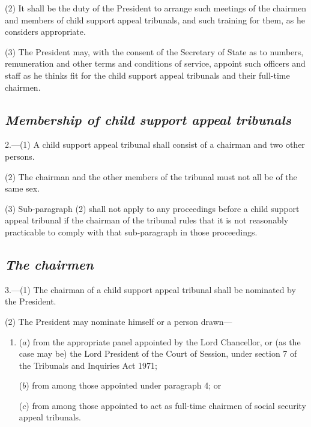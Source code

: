 \documentclass[12pt,a4paper]{article}
\begin{document}
(2) It shall be the duty of the President to arrange such meetings of the chairmen and members of child support appeal tribunals, and such training for them, as he considers appropriate.

(3) The President may, with the consent of the Secretary of State as to numbers, remuneration and other terms and conditions of service, appoint such officers and staff as he thinks fit for the child support appeal tribunals and their full-time chairmen.


\subsection*{\itshape Membership of child support appeal tribunals}

2.---(1) A child support appeal tribunal shall consist of a chairman and two other persons.

(2) The chairman and the other members of the tribunal must not all be of the same sex.

(3) Sub-paragraph (2)  shall not apply to any proceedings before a child support appeal tribunal if the chairman of the tribunal rules that it is not reasonably practicable to comply with that sub-paragraph in those proceedings.

\subsection*{\itshape The chairmen}

3.---(1) The chairman of a child support appeal tribunal shall be nominated by the President.

(2) The President may nominate himself or a person drawn—
\begin{enumerate}\item[]
($a$) from the appropriate panel appointed by the Lord Chancellor, or (as the case may be) the Lord President of the Court of Session, under section 7 of the Tribunals and Inquiries Act 1971;

($b$) from among those appointed under paragraph 4; or

($c$) from among those appointed 
to act as full-time chairmen of social security appeal tribunals.
\end{enumerate}
\end{document}
